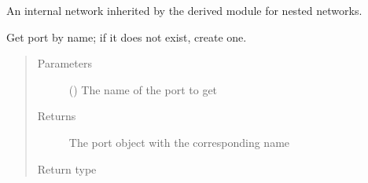 \documentclass[letterpaper,10pt,openany,oneside,english]{sphinxmanual}
\begin{document}
\begin{fulllineitems}
\begin{fulllineitems}
\begin{fulllineitems}
\end{fulllineitems}


\begin{fulllineitems}
\label{\detokenize{src_rst/module:module.Module.__network}}
 \textendash{} An internal network inherited by the derived module for nested networks.

\end{fulllineitems}


\end{fulllineitems}


\begin{fulllineitems}
\label{\detokenize{src_rst/module:module.Module.get_port}}
Get port by name; if it does not exist, create one.
\begin{quote}\begin{description}
\item[{Parameters}] \leavevmode
{} () \textendash{} The name of the port to get

\item[{Returns}] \leavevmode
{} \textendash{} The port object with the corresponding name

\item[{Return type}] \leavevmode
{\hyperref[\detokenize{src_rst/port:port.Port}]{}}

\end{description}\end{quote}

\end{fulllineitems}


\begin{fulllineitems}
\label{\detokenize{src_rst/module:module.Module.network}}
\end{fulllineitems}



\end{fulllineitems}
\end{document}
